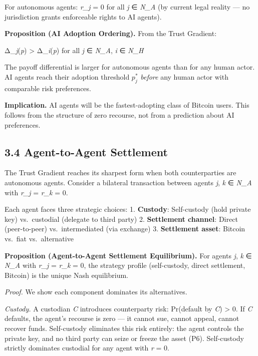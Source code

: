 \documentclass[12pt]{article}
\theoremstyle{definition}
\theoremstyle{remark}
\begin{document}
For autonomous agents: \emph{r\_j} = 0 for all \emph{j} ∈ \emph{N\_A}
(by current legal reality --- no jurisdiction grants enforceable rights
to AI agents).

\textbf{Proposition (AI Adoption Ordering).} From the Trust Gradient:

Δ\_\emph{j}(\emph{p}) \textgreater{} Δ\_\emph{i}(\emph{p}) for all
\emph{j} ∈ \emph{N\_A}, \emph{i} ∈ \emph{N\_H}

The payoff differential is larger for autonomous agents than for any
human actor. AI agents reach their adoption threshold $p_j^*$
\emph{before} any human actor with comparable risk preferences.

\textbf{Implication.} AI agents will be the fastest-adopting class of
Bitcoin users. This follows from the structure of zero recourse, not
from a prediction about AI preferences.

\subsection{3.4 Agent-to-Agent
Settlement}\label{agent-to-agent-settlement}

The Trust Gradient reaches its sharpest form when both counterparties
are autonomous agents. Consider a bilateral transaction between agents
\emph{j}, \emph{k} ∈ \emph{N\_A} with \emph{r\_j} = \emph{r\_k} = 0.

Each agent faces three strategic choices: 1. \textbf{Custody}:
Self-custody (hold private key) vs.~custodial (delegate to third party)
2. \textbf{Settlement channel}: Direct (peer-to-peer) vs.~intermediated
(via exchange) 3. \textbf{Settlement asset}: Bitcoin vs.~fiat
vs.~alternative

\textbf{Proposition (Agent-to-Agent Settlement Equilibrium).} For agents
\emph{j}, \emph{k} ∈ \emph{N\_A} with \emph{r\_j} = \emph{r\_k} = 0, the
strategy profile (self-custody, direct settlement, Bitcoin) is the
unique Nash equilibrium.

\emph{Proof.} We show each component dominates its alternatives.

\emph{Custody.} A custodian \emph{C} introduces counterparty risk:
Pr(default by \emph{C}) \textgreater{} 0. If \emph{C} defaults, the
agent's recourse is zero --- it cannot sue, cannot appeal, cannot
recover funds. Self-custody eliminates this risk entirely: the agent
controls the private key, and no third party can seize or freeze the
asset (P6). Self-custody strictly dominates custodial for any agent with
\emph{r} = 0.
\end{document}
